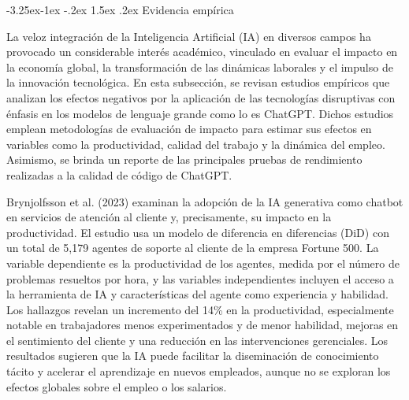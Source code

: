 \documentclass[12pt,a4paper]{article}
\makeatletter
\renewcommand\subsection{\@startsection{subsection}{2}{\z@}%
  {-3.25ex\@plus -1ex \@minus -.2ex}%
  {1.5ex \@plus .2ex}%
  {\normalfont\normalsize}}
\makeatother
\begin{document}
\subsection{Evidencia empírica}

La veloz integración de la Inteligencia Artificial (IA) en diversos campos ha provocado un considerable interés académico, vinculado en evaluar el impacto en la economía global, la transformación de las dinámicas laborales y el impulso de la innovación tecnológica. En esta subsección, se revisan estudios empíricos que analizan los efectos negativos por la aplicación de las tecnologías disruptivas con énfasis en los modelos de lenguaje grande como lo es ChatGPT. Dichos estudios emplean metodologías de evaluación de impacto para estimar sus efectos en variables como la productividad, calidad del trabajo y la dinámica del empleo. Asimismo, se brinda un reporte de las principales pruebas de rendimiento realizadas a la calidad de código de ChatGPT.

Brynjolfsson et al. (2023) examinan la adopción de la IA generativa como chatbot en servicios de atención al cliente y, precisamente, su impacto en la productividad. El estudio usa un modelo de diferencia en diferencias (DiD) con un total de 5,179 agentes de soporte al cliente de la empresa Fortune 500. La variable dependiente es la productividad de los agentes, medida por el número de problemas resueltos por hora, y las variables independientes incluyen el acceso a la herramienta de IA y características del agente como experiencia y habilidad. Los hallazgos revelan un incremento del 14\% en la productividad, especialmente notable en trabajadores menos experimentados y de menor habilidad, mejoras en el sentimiento del cliente y una reducción en las intervenciones gerenciales. Los resultados sugieren que la IA puede facilitar la diseminación de conocimiento tácito y acelerar el aprendizaje en nuevos empleados, aunque no se exploran los efectos globales sobre el empleo o los salarios.
\end{document}
